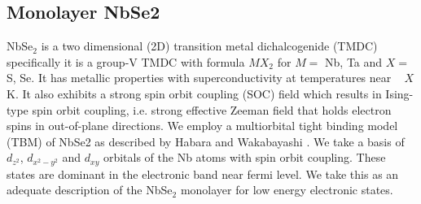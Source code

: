 \documentclass[10pt, twocolumn]{article} %
\begin{document}
\subsection*{Monolayer NbSe2}
  NbSe$_2$ is a two dimensional (2D) transition metal dichalcogenide (TMDC) specifically it is a group-V TMDC with formula $MX_2$ for $M =$ Nb, Ta and $X =$ S, Se. It has metallic properties with superconductivity at temperatures near ~ $X$ K. It also exhibits a strong spin orbit coupling (SOC) field which results in Ising-type spin orbit coupling, i.e. strong effective Zeeman field that holds electron spins in out-of-plane directions. We employ a multiorbital tight binding model (TBM) of NbSe2 as described by Habara and Wakabayashi \cite{Habara2021}. We take a basis of $d_{z^2}$, $d_{x^2 - y^2}$ and $d_{xy}$ orbitals of the Nb atoms with spin orbit coupling. These states are dominant in the electronic band near fermi level. We take this as an adequate description of the NbSe$_2$ monolayer for low energy electronic states.
\end{document}
